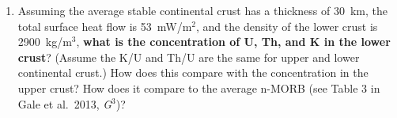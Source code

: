 \documentclass{template}
\newcommand{\solution}[1]{%
\iftoggle{showanswers}{%
\begin{solutionbox}
        #1
\end{solutionbox}%
  }{}%
}
\begin{document}
\begin{enumerate}[label=\textbf{\arabic*.}]
\begin{enumerate}[label=\alph*)]
{    \textbf{K:}
    \begin{align*}
        A_{\text{K}} &= \rho \times \qty{3.48e-9}{\W\per\kg} \\
        &= (\qty{2700}{\kg\per\cubic\metre})(\qty{3.48e-9}{\W\per\kg}) \cdot 0.025 \\
        &= \qty{2.349e-7}{\W\per\cubic\metre}
    \end{align*}

    $$ A = A_{\text{U}} + A_{\text{Th}} + A_{\text{K}} = \num{1.69e-6} $$

    Using the given linear heat flow equation:

    \begin{align*}
        q_s &= q_r + D \times A\\
        &= \qty{15e-3}{\watt\per\m\squared} + \qty{10}{\km} \cdot \qty{1.6942e-6}{\watt\per\m\cubed}\\
        &= \boxed{\qty{31.94}{\mW\per\m\squared}}
    \end{align*}

    This is notably lower than the observed total average value of $\qty{53}{\mW\per\m\squared}$, suggesting that there must be an additional source of heat production.

}

\item Assuming the average stable continental crust has a thickness of 30~km, the total surface heat flow is 53~mW/m$^2$, and the density of the lower crust is 2900~kg/m$^3$, \textbf{what is the concentration of U, Th, and K in the lower crust}? (Assume the K/U and Th/U are the same for upper and lower continental crust.) How does this compare with the concentration in the upper crust? How does it compare to the average n-MORB (see Table 3 in Gale et al.\ 2013, \textit{G$^3$})?


\solution{

    UC = upper crust; LC = lower crust.

    \begin{itemize}
        \item $D_{\text{tot}} = \qty{30000}{\m}$; $D_{UC} = \qty{10000}{\m} \implies D_{LC} = \qty{20000}{\m}$
        \item $q_s = \qty{53}{\milli\watt\per\meter\squared}$
        \item $q_r = \qty{15}{\milli\watt\per\meter\squared}$
        \item $\rho_{LC} = \qty{2900}{\kg\per\meter\cubed}$
        \item $\rho_{UC} = \qty{2700}{\kg\per\meter\cubed}$
    \end{itemize}

}
\end{enumerate}
\end{enumerate}
\end{document}
